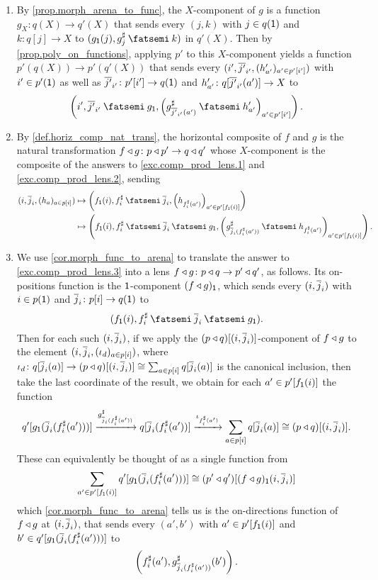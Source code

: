 \documentclass[Book-Poly]{subfiles}
\begin{document}
\begin{exercise}
\begin{solution}
\begin{enumerate}
    \item By \cref{prop.morph_arena_to_func}, the $X$-component of $g$ is a function $g_X\colon q(X)\to q'(X)$ that sends every $(j,k)$ with $j\in q(\textsf{1})$ and $k\colon q[j]\to X$ to $(g_\1(j),g^\sharp_j\then k)$ in $q'(X)$.
    Then by \cref{prop.poly_on_functions}, applying $p'$ to this $X$-component yields a function $p'(q(X))\to p'(q'(X))$ that sends every $(i',\overline{j'}_{i'},(h'_{a'})_{a'\in p'[i']})$ with $i'\in p'(\textsf{1})$ as well as $\overline{j'}_{i'}\colon p'[i']\to q(\textsf{1})$ and $h'_{a'}\colon q[\overline{j'}_{i'}(a')]\to X$ to \[\left(i',\ol{j'}_{i'}\then g_\1,\left(g^\sharp_{\ol{j'}_{i'}(a')}\then h'_{a'}\right)_{a'\in p'[i']}\right).\]

    \item By \cref{def.horiz_comp_nat_trans}, the horizontal composite of $f$ and $g$ is the natural transformation $f\mathbin{\triangleleft} g\colon p\mathbin{\triangleleft} p'\to q\mathbin{\triangleleft} q'$ whose $X$-component is the composite of the answers to \cref{exc.comp_prod_lens.1} and \cref{exc.comp_prod_lens.2}, sending
    \begin{align*}
        (i,\ol{j}_i,(h_a)_{a\in p[i]})&\mapsto\left(f_\1(i),f^\sharp_i\then\ol{j}_i,\left(h_{f^\sharp_i(a')}\right)_{a'\in p'[f_\1(i)]}\right)\\
        &\mapsto\left(f_\1(i),f^\sharp_i\then\ol{j}_i\then g_\1, \left(g^\sharp_{\ol{j}_{i}(f^\sharp_i(a'))}\then h_{f^\sharp_i(a')}\right)_{a'\in p'[f_\1(i)]}\right).
    \end{align*}

    \item We use \cref{cor.morph_func_to_arena} to translate the answer to \cref{exc.comp_prod_lens.3} into a lens $f\mathbin{\triangleleft} g\colon p\mathbin{\triangleleft} q\to p'\mathbin{\triangleleft} q'$, as follows.
    Its on-positions function is the $\textsf{1}$-component $(f\mathbin{\triangleleft} g)_{\textsf{1}}$, which sends every $(i,\overline{j}_i)$ with $i\in p(\textsf{1})$ and $\overline{j}_i\colon p[i]\to q(\textsf{1})$ to
    \[
        (f_\1(i),f^\sharp_i\then\ol{j}_i\then g_\1).
    \]
    Then for each such $(i,\overline{j}_i)$, if we apply the $(p\mathbin{\triangleleft} q)[(i,\overline{j}_i)]$-component of $f\mathbin{\triangleleft} g$ to the element $(i,\overline{j}_i,(\iota_d)_{a\in p[i]})$, where $\iota_d\colon q[\overline{j}_i(a)]\to(p\mathbin{\triangleleft} q)[(i,\overline{j}_i)]\cong\sum_{a\in p[i]}q[\overline{j}_i(a)]$ is the canonical inclusion, then take the last coordinate of the result, we obtain for each $a'\in p'[f_{\textsf{1}}(i)]$ the function
    \[
        q'[g_{\textsf{1}}(\overline{j}_i(f^\sharp_i(a')))] \xrightarrow{g^\sharp_{\overline{j}_{i}(f^\sharp_i(a'))}} q[\overline{j}_i(f^\sharp_i(a'))] \xrightarrow{\iota_{f^\sharp_i(a')}} \sum_{a\in p[i]}q[\overline{j}_i(a)] \cong (p\mathbin{\triangleleft} q)[(i,\overline{j}_i)].
    \]
    These can equivalently be thought of as a single function from
    \[
        \sum_{a'\in p'[f_{\textsf{1}}(i)]} q'[g_{\textsf{1}}(\overline{j}_i(f^\sharp_i(a')))] \cong (p'\mathbin{\triangleleft} q')[(f\mathbin{\triangleleft} g)_{\textsf{1}}(i,\overline{j}_i)]
    \]
    which \cref{cor.morph_func_to_arena} tells us is the on-directions function of $f\mathbin{\triangleleft} g$ at $(i,\overline{j}_i)$, that sends every $(a',b')$ with $a'\in p'[f_{\textsf{1}}(i)]$ and $b'\in q'[g_{\textsf{1}}(\overline{j}_i(f^\sharp_i(a')))]$ to
    \[
        \left(f^\sharp_i(a'), g^\sharp_{\overline{j}_i(f^\sharp_i(a'))}(b')\right).
    \]
\end{enumerate}
\end{solution}
\end{exercise}
\end{document}
